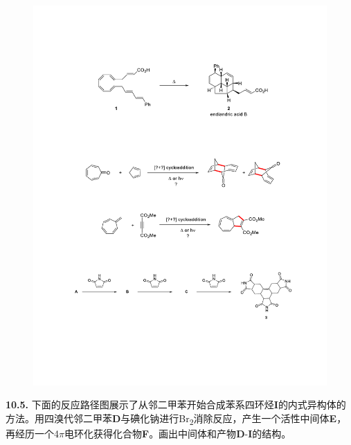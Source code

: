 \begin{figure}[h]
	\centering
	\includegraphics[width=16cm]{./pic/t10-5.pdf}
\end{figure}

\noindent\textbf{10.5.}
下面的反应路径图展示了从邻二甲苯开始合成苯系四环烃\textbf{I}的内式异构体的方法。用四溴代邻二甲苯\textbf{D}与碘化钠进行Br\textsubscript{2}消除反应，产生一个活性中间体\textbf{E}，再经历一个4$\pi$电环化获得化合物\textbf{F}。画出中间体和产物\textbf{D}-\textbf{I}的结构。

